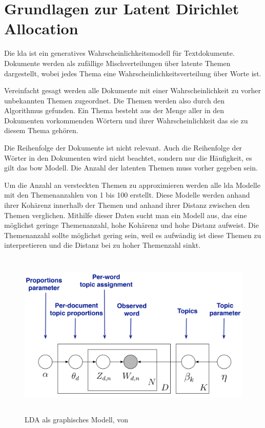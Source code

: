 \chapter{Grundlagen zur Latent Dirichlet Allocation}

Die \gls{lda} ist ein generatives Wahrscheinlichkeitsmodell für Textdokumente. \parencite[vgl.][S. 996]{Blei03latentdirichlet} Dokumente werden als zufällige Mischverteilungen über latente Themen dargestellt, wobei jedes Thema eine Wahrscheinlichkeitsverteilung über Worte ist. 

Vereinfacht gesagt werden alle Dokumente mit einer Wahrscheinlichkeit zu vorher unbekannten Themen zugeordnet. Die Themen werden also durch den Algorithmus gefunden. Ein Thema besteht aus der Menge aller in den Dokumenten vorkommenden Wörtern und ihrer Wahrscheinlichkeit das sie zu diesem Thema gehören.


Die Reihenfolge der Dokumente ist nicht relevant. Auch die Reihenfolge der Wörter in den Dokumenten wird nicht beachtet, sondern nur die Häufigkeit, es gilt das \gls{bow} Modell. \parencite[vgl.][S. 155-156]{harris1954distributional} Die Anzahl der latenten Themen muss vorher gegeben sein.


Um die Anzahl an versteckten Themen zu approximieren werden alle \gls{lda} Modelle mit den Themenanzahlen von 1 bis 100 erstellt. Diese Modelle werden anhand ihrer Kohärenz innerhalb der Themen und anhand ihrer Distanz zwischen den Themen verglichen. Mithilfe dieser Daten sucht man ein Modell aus, das eine möglichst geringe Themenanzahl, hohe Kohärenz und hohe Distanz aufweist. Die Themenanzahl sollte möglichst gering sein, weil es aufwändig ist diese Themen zu interpretieren und die Distanz bei zu hoher Themenzahl sinkt.

\begin{figure}[htpb]
	\centering
	\includegraphics[width=\textwidth,height=8cm,keepaspectratio=true]{lda.png}
	\caption{
		LDA als graphisches Modell, von \parencite[vgl.][S. 23]{ProbabilisticTopicModels}
	}
	\label{fig:LDA Modell}
\end{figure}


